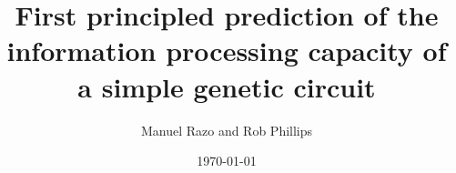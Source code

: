 



\newcommand{\mrm}[1]{\textcolor{ForestGreen}{(MR:~#1)}} %
\newcommand{\rp}[1]{\textcolor{red}{(RP:~#1)}} %

\newcommand{\captionStroke}[1]{\textbf{#1}}

\usepackage{xparse}

\DeclareDocumentCommand {}
{}

\DeclareDocumentCommand {}
{}

\newcommand{\letter}[1]{#1} %
\newcommand{\letterParen}[1]{(#1)} %

\title{\textbf{First principled prediction of the information processing
capacity of a simple genetic circuit}}
\author{Manuel Razo and Rob Phillips}
\date{\today}


\maketitle
	
%	
	
	



